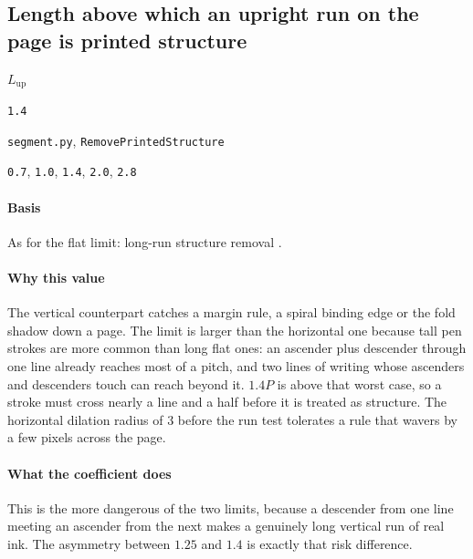 \subsection{Length above which an upright run on the page is printed structure}

\label{coef:rule-upright-len}

\begin{description}[leftmargin=5.2em,style=sameline]

\item[Symbol] $L_{\text{up}}$

\item[Value] \texttt{1.4}

\item[Source] \texttt{segment.py}, \texttt{RemovePrintedStructure}

\item[Swept] \texttt{0.7}, \texttt{1.0}, \texttt{1.4}, \texttt{2.0}, \texttt{2.8}

\end{description}

\paragraph{Basis}

As for the flat limit: long-run structure removal \cite{haralick1987,shafait2008}.

\paragraph{Why this value}

The vertical counterpart catches a margin rule, a spiral binding edge or the fold shadow down a page. The limit is larger than the horizontal one because tall pen strokes are more common than long flat ones: an ascender plus descender through one line already reaches most of a pitch, and two lines of writing whose ascenders and descenders touch can reach beyond it. $1.4P$ is above that worst case, so a stroke must cross nearly a line and a half before it is treated as structure. The horizontal dilation radius of $3$ before the run test tolerates a rule that wavers by a few pixels across the page.

\paragraph{What the coefficient does}

This is the more dangerous of the two limits, because a descender from one line meeting an ascender from the next makes a genuinely long vertical run of real ink. The asymmetry between $1.25$ and $1.4$ is exactly that risk difference.

